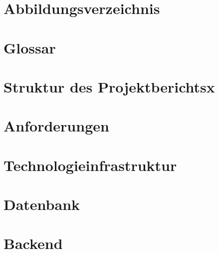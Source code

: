 \documentclass[a4paper,12pt,oneside]{article}
\begin{document}

\newpage

\tableofcontents
\pagestyle{fancy} %

\newpage
\section*{Abbildungsverzeichnis}
\renewcommand{\listfigurename}{} %
\thispagestyle{empty}
\listoffigures

\section*{Glossar}%


\newpage
\section*{Struktur des Projektberichtsx}\label{kap_struktur}


\newpage
\section{Anforderungen}\label{kap_anforderungen}


\newpage
\section{Technologieinfrastruktur}\label{kap_Technologieinfrastruktur}


\newpage
\section{Datenbank}\label{kap_Datenbank}


\newpage
\section{Backend}\label{kap_Backend}

\end{document}
